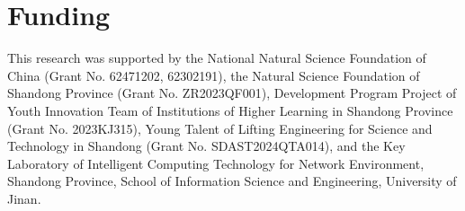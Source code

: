 \documentclass[preprint,12pt]{elsarticle}
\begin{document}
\section*{Funding}
This research was supported by the National Natural Science Foundation of China (Grant No. 62471202, 62302191), the Natural Science Foundation of Shandong Province (Grant No. ZR2023QF001), Development Program Project of Youth Innovation Team of Institutions of Higher Learning in Shandong Province (Grant No. 2023KJ315), Young Talent of Lifting Engineering for Science and Technology in Shandong (Grant No. SDAST2024QTA014), and the Key Laboratory of Intelligent Computing Technology for Network Environment, Shandong Province, School of Information Science and Engineering, University of Jinan.
\end{document}

